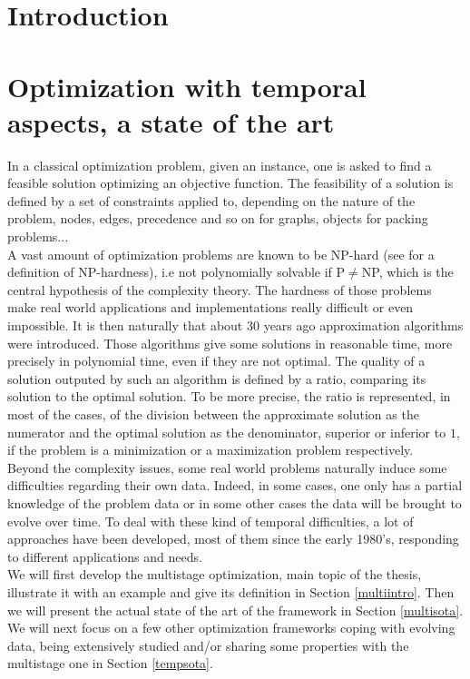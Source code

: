 \documentclass[a4paper]{book}
\newcommand{\chapterToc}[1]{\chapter*{\numberline{} #1} \addcontentsline{toc}{chapter}{#1} \markboth{#1}{}}
\begin{document}
    \vspace{1.5cm}











\tableofcontents



\chapterToc{Introduction}
\chapter{Optimization with temporal aspects, a state of the art}



In a classical optimization problem, given an instance, one is asked to find a feasible solution optimizing an objective function. The feasibility of a solution is defined by a set of constraints applied to, depending on the nature of the problem, nodes, edges, precedence and so on for graphs, objects for packing problems...\\ A vast amount of optimization problems are known to be NP-hard (see \cite{gj} for a definition of NP-hardness), i.e not polynomially solvable if P$\ne$NP, which is the central hypothesis of the complexity theory. The hardness of those problems make real world applications and implementations really difficult or even impossible. It is then naturally that about 30 years ago approximation algorithms were introduced. Those algorithms give some solutions in reasonable time, more precisely in polynomial time, even if they are not optimal. The quality of a solution outputed by such an algorithm is defined by a ratio, comparing its solution to the optimal solution. To be more precise, the ratio is represented, in most of the cases, of the division between the approximate solution as the numerator and the optimal solution as the denominator, superior or inferior to $1$, if the problem is a minimization or a maximization problem respectively.\\
Beyond the complexity issues, some real world problems naturally induce some difficulties regarding their own data. Indeed, in some cases, one only has a partial knowledge of the problem data or in some other cases the data will be brought to evolve over time. To deal with these kind of temporal difficulties, a lot of approaches have been developed, most of them since the early 1980's, responding to different applications and needs. \\
We will first develop the multistage optimization, main topic of the thesis, illustrate it with an example and give its definition in Section \ref{multiintro}. Then we will present the actual state of the art of the framework in Section \ref{multisota}. \\
We will next focus on a few other optimization frameworks coping with evolving data, being extensively studied and/or sharing some properties with the multistage one in Section \ref{tempsota}. 
\end{document}

